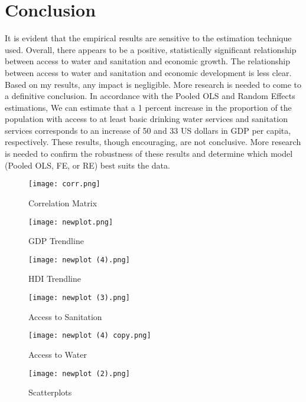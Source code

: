 \documentclass{article}
\begin{document}
\section{Conclusion}
It is evident that the empirical results are sensitive to the estimation technique used. Overall, there appears to be a positive, statistically significant relationship between access to water and sanitation and economic growth. The relationship between access to water and sanitation and economic development is less clear. Based on my results, any impact is negligible. More research is needed to come to a definitive conclusion. In accordance with the Pooled OLS and Random Effects estimations, We can estimate that a 1 percent increase in the proportion of the population with access to at least basic drinking water services and sanitation services corresponds to an increase of 50 and 33 US dollars in GDP per capita, respectively. These results, though encouraging, are not conclusive. More research is needed to confirm the robustness of these results and determine which model (Pooled OLS, FE, or RE) best suits the data. 

\begin{figure}[h!]
\centering
\texttt{[image: corr.png]}
\caption{Correlation Matrix}
\label{fig:universe}
\end{figure}

\begin{figure}[h!]
\centering
\texttt{[image: newplot.png]}
\caption{GDP Trendline}
\label{fig:universe}
\end{figure}

\begin{figure}[h!]
\centering
\texttt{[image: newplot (4).png]}
\caption{HDI Trendline}
\label{fig:universe}
\end{figure}

\begin{figure}[h!]
\centering
\texttt{[image: newplot (3).png]}
\caption{Access to Sanitation}
\label{fig:universe}
\end{figure}

\begin{figure}[h!]
\centering
\texttt{[image: newplot (4) copy.png]}
\caption{Access to Water}
\label{fig:universe}
\end{figure}


\begin{landscape}
\begin{figure}[h!]
\centering
\texttt{[image: newplot (2).png]}
\caption{Scatterplots}
\label{fig:universe}
\end{figure}
\end{landscape}
\end{document}
